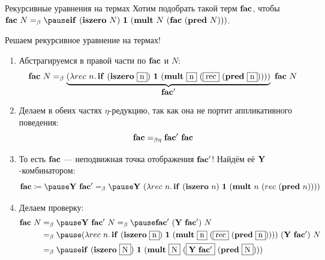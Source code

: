     \begin{frame}{Рекурсивные уравнения на термах}
        Хотим подобрать такой терм $\mathbf{fac}$, чтобы $\term{fac} \ap N \eqbeta \pause \term{if} \ap (\term{iszero} \ap N) \ap \term{1} \ap (\term{mult} \ap N \ap (\term{fac} \ap (\term{pred} \ap N)))$.

        \pause
        \vspace{0.5em}
        Решаем рекурсивное уравнение на термах!
        \begin{enumerate}
            \item \pause Абстрагируемся в правой части по $\mathbf{fac}$ и $N$:
            \[
                \term{fac} \ap N
                \eqbeta
                \underbrace{(\lambda rec \ap n \ldotp \term{if} \ap (\term{iszero} \ap \framebox{n}) \ap \term{1} \ap (\term{mult} \ap \framebox{n} \ap (\framebox{rec} \ap (\term{pred} \ap \framebox{n}))))}_{\textstyle \term{fac'}}
                \ap \term{fac} \ap N
            \]
            \item \pause Делаем в обеих частях $\eta$-редукцию, так как она не портит аппликативного поведения:
            \[
                \mathbf{fac} =_{\beta\eta} \mathbf{fac'} ~ \mathbf{fac}
            \]
            \item \pause То есть $\mathbf{fac}$ --- неподвижная точка отображения $\mathbf{fac'}$!  Найдём её $\mathbf{Y}$-комбинатором:
            \[
                \term{fac}
                \termdef \pause
                \comb{Y} \ap \term{fac'}
                \eqt_{\beta} \pause
                \comb{Y} \ap (\lambda rec \ap n \ldotp \term{if} \ap (\term{iszero} \ap n) \ap \term{1} \ap (\term{mult} \ap n \ap (rec \ap (\term{pred} \ap n))))
            \]
            \vspace{-1em}
            \item \pause Делаем проверку:
            \begin{align*}
                \term{fac} \ap N
                &\eqbeta \pause
                \comb{Y} \ap \term{fac'} \ap N
                \eqbeta \pause
                \term{fac'} \ap (\comb{Y} \ap \term{fac'}) \ap N
                \\&\eqbeta \pause
                (\lambda rec \ap n \ldotp \term{if} \ap (\term{iszero} \ap \framebox{n}) \ap \term{1} \ap (\term{mult} \ap \framebox{n} \ap (\framebox{rec} \ap (\term{pred} \ap \framebox{n})))) \ap (\comb{Y} \ap \term{fac'}) \ap N
                \\&\eqbeta \pause
                \term{if} \ap (\term{iszero} \ap \framebox{N}) \ap \term{1} \ap (\term{mult} \ap \framebox{N} \ap (\framebox{$\comb{Y} \ap \term{fac'}$} \ap (\term{pred} \ap \framebox{N})))
            \end{align*}
        \end{enumerate}
    \end{frame}

